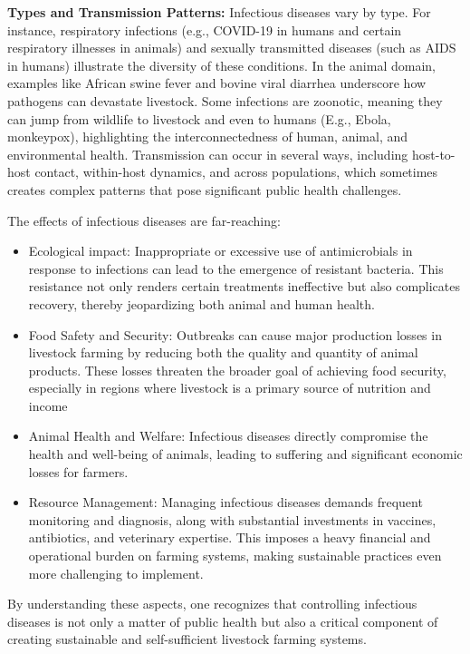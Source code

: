 \textbf{Types and Transmission Patterns:} Infectious diseases vary by type. For instance, respiratory infections (e.g., COVID-19 in humans and certain respiratory illnesses in animals) and sexually transmitted diseases (such as AIDS in humans) illustrate the diversity of these conditions. In the animal domain, examples like African swine fever and bovine viral diarrhea underscore how pathogens can devastate livestock. Some infections are zoonotic, meaning they can jump from wildlife to livestock and even to humans (E.g., Ebola, monkeypox), highlighting the interconnectedness of human, animal, and environmental health. Transmission can occur in several ways, including host-to-host contact, within-host dynamics, and across populations, which sometimes creates complex patterns that pose significant public health challenges.

The effects of infectious diseases are far-reaching:
\begin{itemize}
    \item Ecological impact: Inappropriate or excessive use of antimicrobials in response to infections can lead to the emergence of resistant bacteria. This resistance not only renders certain treatments ineffective but also complicates recovery, thereby jeopardizing both animal and human health.
    \item Food Safety and Security: Outbreaks can cause major production losses in livestock farming by reducing both the quality and quantity of animal products. These losses threaten the broader goal of achieving food security, especially in regions where livestock is a primary source of nutrition and income
    \item Animal Health and Welfare: Infectious diseases directly compromise the health and well-being of animals, leading to suffering and significant economic losses for farmers.
    \item Resource Management: Managing infectious diseases demands frequent monitoring and diagnosis, along with substantial investments in vaccines, antibiotics, and veterinary expertise. This imposes a heavy financial and operational burden on farming systems, making sustainable practices even more challenging to implement.
\end{itemize}

By understanding these aspects, one recognizes that controlling infectious diseases is not only a matter of public health but also a critical component of creating sustainable and self-sufficient livestock farming systems.

